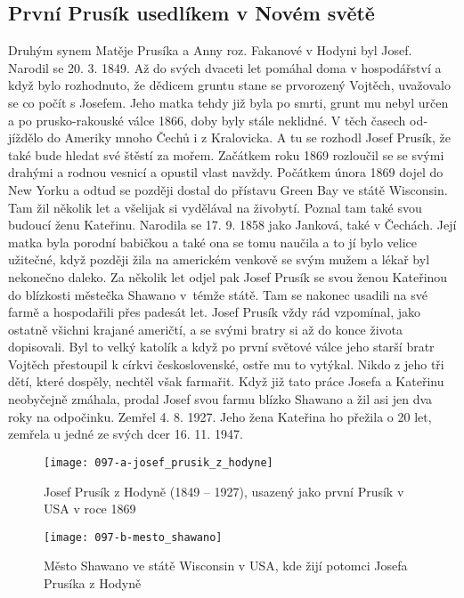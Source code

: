 \documentclass[../dejiny-rodu-prusiku.tex]{subfiles}
\begin{document}
\subsection{První Prusík usedlíkem v Novém světě}

Druhým synem Matěje Prusíka a Anny roz. Fakanové v Ho­dyni byl Josef. Narodil se 20. 3. 1849. Až do svých dva­ceti let pomáhal doma v hospodářství a když bylo rozhodnuto, že dědicem gruntu stane se prvorozený Vojtěch, uvažovalo se co počít s Josefem. Jeho matka tehdy již byla po smrti, grunt mu nebyl určen a po prusko-rakouské válce 1866, doby byly stále neklidné. V těch časech od­jíždělo do Ameriky mnoho Čechů i z Kralovicka. A tu se rozhodl Josef Prusík, že také bude hledat své štěstí za mořem. Začátkem roku 1869 rozloučil se se svými drahými a rodnou vesnicí a opustil vlast navždy. Počátkem února 1869 dojel do New Yorku a odtud se později dostal do přístavu Green Bay ve státě Wisconsin. Tam žil několik let a všelijak si vydělával na živobytí. Poznal tam také svou budoucí ženu Kateřinu. Narodila se 17. 9. 1858 jako Janková, také v Čechách. Její matka byla porodní babičkou a také ona se tomu naučila a to jí bylo velice užitečné, když později žila na americkém venkově se svým mužem a lékař byl nekonečno daleko. Za několik let odjel pak Josef Prusík se svou ženou Kateřinou do blízkosti městečka Shawano v témže státě. Tam se nakonec usadili na své farmě a hospodařili přes padesát let. Josef Prusík vždy rád vzpomínal, jako
ostatně všichni krajané američtí, a se svými bratry si až do konce života dopisovali. Byl to velký katolík a když po první světové válce jeho starší bratr Vojtěch přestoupil k církvi československé, ostře mu to vytýkal. Nikdo z jeho tři dětí, které dospěly, nechtěl však farmařit. Když již tato práce Josefa a Kateřinu neobyčejně zmáhala, prodal Josef svou farmu blízko Shawano a žil asi jen dva roky na odpočinku. Zemřel 4. 8. 1927. Jeho žena Kateřina ho přežila o 20 let, zemřela u jedné ze svých dcer 16. 11. 1947.

\begin{figure}
\centering
\texttt{[image: 097-a-josef\_prusik\_z\_hodyne]}
\caption{Josef Prusík z Hodyně (1849 – 1927), usazený jako první Prusík v USA v roce 1869}
\label{fig:097-a-josef_prusik_z_hodyne}
\end{figure}

\begin{figure}
\centering
\texttt{[image: 097-b-mesto\_shawano]}
\caption{Město Shawano ve státě Wisconsin v USA, kde žijí potomci Josefa Prusíka z Hodyně}
\label{fig:097-b-mesto_shawano}
\end{figure}
\end{document}
